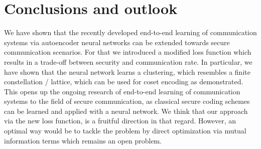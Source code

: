 \documentclass[conference]{IEEEtran}
\begin{document}
\section{Conclusions and outlook}
We have shown that the recently developed end-to-end learning of communication systems via autoencoder neural networks can be extended towards secure communication scenarios. For that we introduced a modified loss function which results in a trade-off between security and communication rate. In particular, we have shown that the neural network learns a clustering, which resembles a finite constellation / lattice, which can be used for coset encoding as demonstrated. This opens up the ongoing research of end-to-end learning of communication systems to the field of secure communication, as classical secure coding schemes can be learned and applied with a neural network. We think that our approach via the new loss function, is a fruitful direction in that regard. However, an optimal way would be to tackle the problem by direct optimization via mutual information terms which remains an open problem.

\medskip

\small



\end{document}
